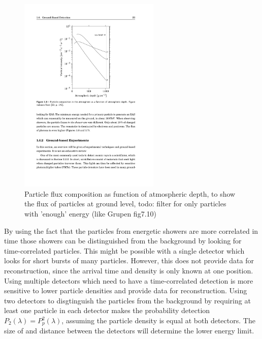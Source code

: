 \begin{figure}
    \centering
    \includegraphics[width=0.6\textwidth]
                    {plots/experiment/particle_density}
    \caption{Particle flux composition as function of atmospheric depth, to show the flux of particles at ground level, todo: filter for only particles with 'enough' energy (like Grupen fig7.10)}
    \label{fig:particle_density}
\end{figure}

By using the fact that the particles from energetic showers are more correlated in time those showers can be distinguished from the background by looking for time-correlated particles. This might be possible with a single detector which looks for short bursts of many particles. However, this does not provide data for reconstruction, since the arrival time and density is only known at one position. Using multiple detectors which need to have a time-correlated detection is more sensitive to lower particle densities and provide data for reconstruction. Using two detectors to disgtinguish the particles from the background by requiring at least one particle in each detector makes the probability detection $P_2(\lambda) = P_p^2(\lambda)$, assuming the particle density is equal at both detectors. The size of and distance between the detectors will determine the lower energy limit.

